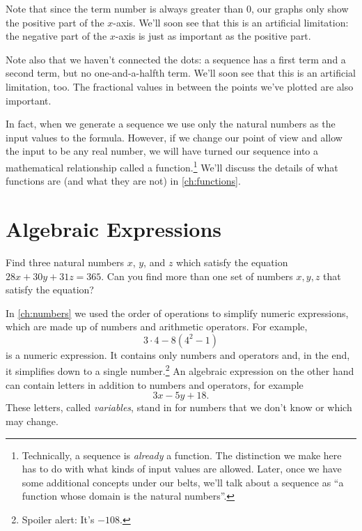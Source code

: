 Note that since the term number is always greater than 0, our graphs only show the positive part of the $x$-axis. We'll soon see that this is an artificial limitation: the negative part of the $x$-axis is just as important as the positive part.

Note also that we haven't connected the dots: a sequence has a first term and a second term, but no one-and-a-halfth term. We'll soon see that this is an artificial limitation, too. The fractional values in between the points we've plotted are also important.

In fact, when we generate a sequence we use only the natural numbers as the input values to the formula. However, if we change our point of view and allow the input to be any real number, we will have turned our sequence into a mathematical relationship called a \gls{function}.\footnote{Technically, a sequence is \textit{already} a function. The distinction we make here has to do with what kinds of input values are allowed. Later, once we have some additional concepts under our belts, we'll talk about a sequence as ``a function whose domain is the natural numbers''.} We'll discuss the details of what functions are (and what they are not) in \cref{ch:functions}.


\section{Algebraic Expressions}
\label{sec:algexpr}

\begin{boxedexplore}
Find three natural numbers $x$, $y$, and $z$ which satisfy the equation $28x + 30y + 31z = 365$. Can you find more than one set of numbers $x,y,z$ that satisfy the equation?
\end{boxedexplore}

In \cref{ch:numbers} we used the order of operations to simplify numeric expressions, which are made up of numbers and arithmetic operators. For example, \[3\cdot4-8(4^2-1)\] is a numeric expression. It contains only numbers and operators and, in the end, it simplifies down to a single number.\footnote{Spoiler alert: It's $-108$.} An \gls{algebraic expression} on the other hand can contain letters in addition to numbers and operators, for example \[3x - 5y + 18.\] These letters, called \textit{variables}, stand in for numbers that we don't know or which may change.

